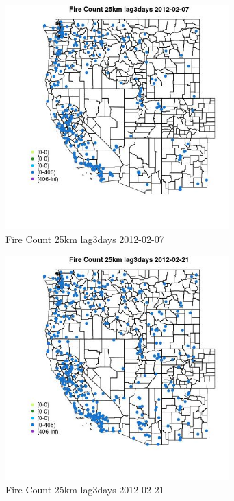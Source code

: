 \begin{figure} 
\centering  
\includegraphics[width=0.77\textwidth]{Code_Outputs/Report_ML_input_PM25_Step4_part_f_de_duplicated_aveswNAs_MapObsFire_Count_25km_lag3days2012-02-07.jpg} 
\caption{\label{fig:Report_ML_input_PM25_Step4_part_f_de_duplicated_aveswNAsMapObsFire_Count_25km_lag3days2012-02-07}Fire Count 25km lag3days 2012-02-07} 
\end{figure} 
 

\clearpage 

\begin{figure} 
\centering  
\includegraphics[width=0.77\textwidth]{Code_Outputs/Report_ML_input_PM25_Step4_part_f_de_duplicated_aveswNAs_MapObsFire_Count_25km_lag3days2012-02-21.jpg} 
\caption{\label{fig:Report_ML_input_PM25_Step4_part_f_de_duplicated_aveswNAsMapObsFire_Count_25km_lag3days2012-02-21}Fire Count 25km lag3days 2012-02-21} 
\end{figure} 
 

